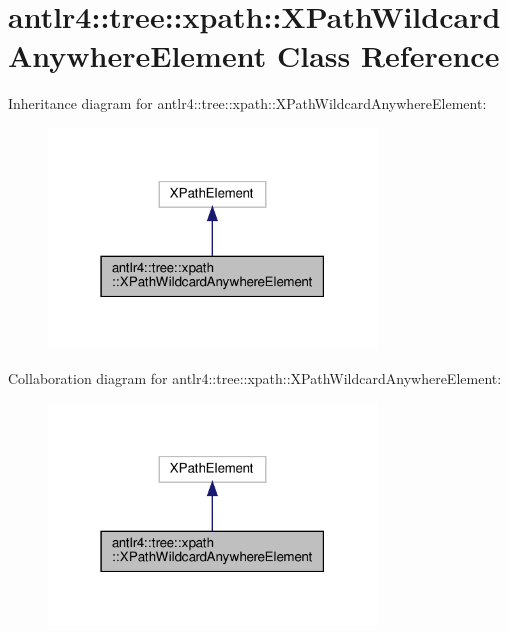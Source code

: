 \hypertarget{classantlr4_1_1tree_1_1xpath_1_1XPathWildcardAnywhereElement}{}\section{antlr4\+:\+:tree\+:\+:xpath\+:\+:X\+Path\+Wildcard\+Anywhere\+Element Class Reference}
\label{classantlr4_1_1tree_1_1xpath_1_1XPathWildcardAnywhereElement}


Inheritance diagram for antlr4\+:\+:tree\+:\+:xpath\+:\+:X\+Path\+Wildcard\+Anywhere\+Element\+:
\nopagebreak
\begin{figure}[H]
\begin{center}
\leavevmode
\includegraphics[width=247pt]{classantlr4_1_1tree_1_1xpath_1_1XPathWildcardAnywhereElement__inherit__graph}
\end{center}
\end{figure}


Collaboration diagram for antlr4\+:\+:tree\+:\+:xpath\+:\+:X\+Path\+Wildcard\+Anywhere\+Element\+:
\nopagebreak
\begin{figure}[H]
\begin{center}
\leavevmode
\includegraphics[width=247pt]{classantlr4_1_1tree_1_1xpath_1_1XPathWildcardAnywhereElement__coll__graph}
\end{center}
\end{figure}
